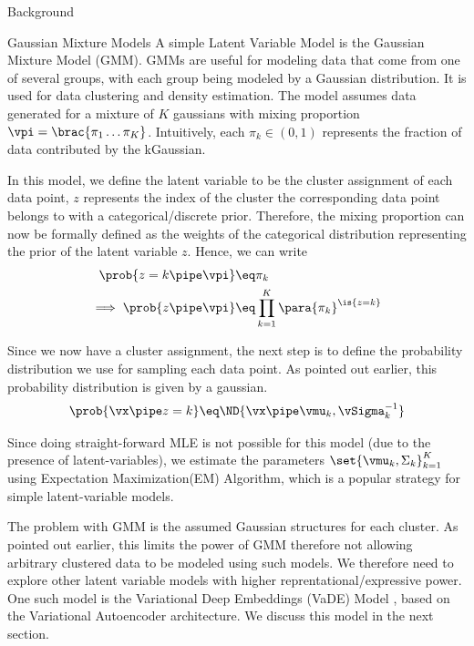 \documentclass{article}
\begin{document}
\begin{psection}{Background}
	\begin{psubsection}{Gaussian Mixture Models}
		A simple Latent Variable Model is the Gaussian Mixture Model (GMM). GMMs are useful for modeling data that come from one of several groups, with each group being modeled by a Gaussian distribution. It is used for data clustering and density estimation. The model assumes data generated for a mixture of $K$ gaussians with mixing proportion $\vpi = \brac{\pi_1 \dots \pi_K}$. Intuitively, each $\pi_k \in (0,1)$ represents the fraction of data contributed by the k\tth Gaussian.

		In this model, we define the latent variable to be the cluster assignment of each data point, \ie $z$ represents the index of the cluster the corresponding data point belongs to with a categorical/discrete prior. Therefore, the mixing proportion can now be formally defined as the weights of the categorical distribution representing the prior of the latent variable $z$. Hence, we can write
		\begin{align*}
			\prob{z = k \pipe \vpi}			&\eq \pi_k \\
			\implies \prob{z \pipe \vpi}	&\eq \prod_{k = 1}^K \para{\pi_k}^{\is{z = k}}
		\end{align*}

		Since we now have a cluster assignment, the next step is to define the probability distribution we use for sampling each data point. As pointed out earlier, this probability distribution is given by a gaussian.
		\begin{align*}
			\prob{\vx \pipe z = k} \eq \ND{\vx \pipe \vmu_k, \vSigma_k^{-1}}
		\end{align*}

		Since doing straight-forward MLE is not possible for this model (due to the presence of latent-variables), we estimate the parameters $\set{\vmu_k, \Sigma_k}_{k = 1}^K$ using Expectation Maximization(EM) Algorithm, which is a popular strategy for simple latent-variable models.

		The problem with GMM is the assumed Gaussian structures for each cluster. As pointed out earlier, this limits the power of GMM therefore not allowing arbitrary clustered data to be modeled using such models. We therefore need to explore other latent variable models with higher reprentational/expressive power. One such model is the Variational Deep Embeddings (VaDE) Model \citep{vade}, based on the Variational Autoencoder architecture. We discuss this model in the next section.
	\end{psubsection}


\end{psection}
\end{document}
